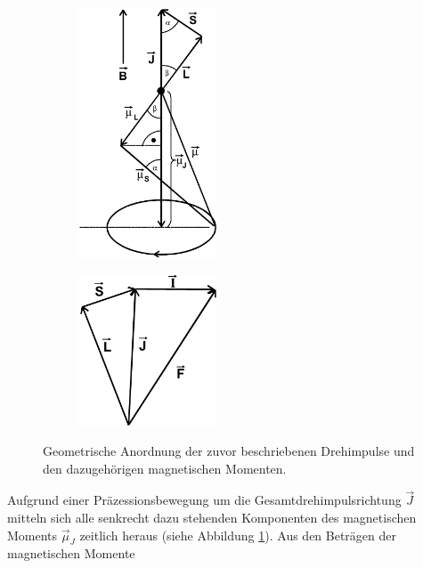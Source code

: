 
\begin{figure}
\centering
\begin{subfigure}{.5\textwidth}
	\centering
	\includegraphics[width=0.45\textwidth]{ressources/Theorie1.png}
	\caption{}
	\label{fig:Theorie1}
\end{subfigure}%
\begin{subfigure}{.5\textwidth}
	\centering
	\includegraphics[width=0.45\textwidth]{ressources/Theorie2.png}
	\caption{}
	\label{fig:Theorie2}
\end{subfigure}
\caption{Geometrische Anordnung der zuvor beschriebenen Drehimpulse und den dazugehörigen magnetischen Momenten. \cite{skript}}
\label{fig:geoAnordnung}
\end{figure}

Aufgrund einer Präzessionsbewegung um die Gesamtdrehimpulsrichtung $\vec{J}$ mitteln sich alle senkrecht dazu stehenden Komponenten des magnetischen Moments $\vec{\mu}_J$  zeitlich heraus (siehe Abbildung \ref{fig:Theorie1}). Aus den Beträgen der magnetischen Momente

